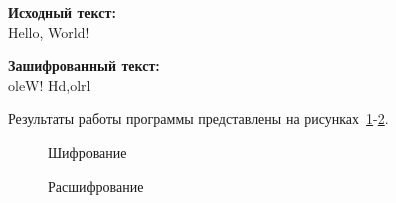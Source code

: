 \textbf{Исходный текст:} \\
    Hello, World!

\textbf{Зашифрованный текст:} \\
    oleW! Hd,olrl

Результаты работы программы представлены на рисунках~\ref{ris:encode-test-1}-\ref{ris:decode-test-1}.

\vspace{\baselineskip}
\begin{figure}[H]
    \caption{Шифрование}
\label{ris:encode-test-1}
\end{figure}

\vspace{\baselineskip}
\begin{figure}[H]
    \caption{Расшифрование}
\label{ris:decode-test-1}
\end{figure}
